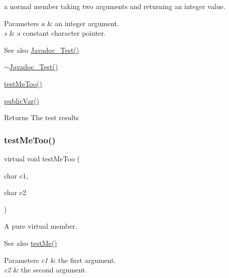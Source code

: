 a normal member taking two arguments and returning an integer value. 


\begin{DoxyParams}{Parameters}
{\em a} & an integer argument. \\
\hline
{\em s} & a constant character pointer. \\
\hline
\end{DoxyParams}
\begin{DoxySeeAlso}{See also}
\mbox{\hyperlink{class_javadoc___test_a7adb1076a9f698a2aa8a5ac0879f34ff}{Javadoc\+\_\+\+Test()}} 

\mbox{\hyperlink{class_javadoc___test_abda4d40f58e25104c7087e435fb0ddd0}{$\sim$\+Javadoc\+\_\+\+Test()}} 

\mbox{\hyperlink{class_javadoc___test_afe4f857536cdccd2f160ad619a61eba3}{test\+Me\+Too()}} 

\mbox{\hyperlink{class_javadoc___test_a292887ac25652b1d8448430f583378c3}{public\+Var()}} 
\end{DoxySeeAlso}
\begin{DoxyReturn}{Returns}
The test results 
\end{DoxyReturn}
\mbox{\label{class_javadoc___test_afe4f857536cdccd2f160ad619a61eba3}} 
\subsubsection{\texorpdfstring{test\+Me\+Too()}{testMeToo()}}
{\footnotesize\ttfamily virtual void test\+Me\+Too (\begin{DoxyParamCaption}\item[{char}]{c1,  }\item[{char}]{c2 }\end{DoxyParamCaption})\hspace{0.3cm}{\ttfamily [pure virtual]}}



A pure virtual member. 

\begin{DoxySeeAlso}{See also}
\mbox{\hyperlink{class_javadoc___test_af1299ea1b7efeb1548c7aba201ebe756}{test\+Me()}} 
\end{DoxySeeAlso}

\begin{DoxyParams}{Parameters}
{\em c1} & the first argument. \\
\hline
{\em c2} & the second argument. \\
\hline
\end{DoxyParams}


